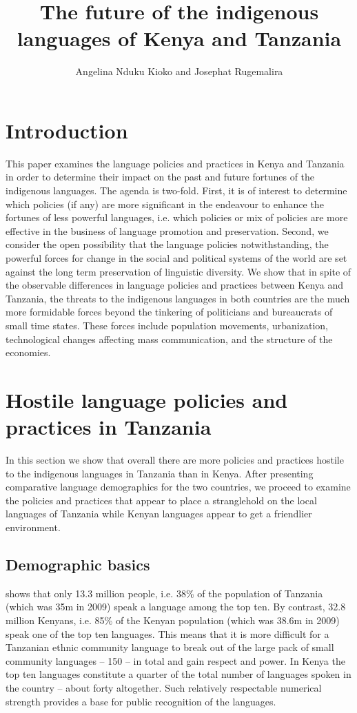 \documentclass[output=paper,colorlinks,citecolor=brown]{langscibook}
\author{Angelina Nduku Kioko\affiliation{US International University-Africa} and Josephat Rugemalira \affiliation{Tumaini University College Dar es Salaam}}
\title{The future of the indigenous languages of Kenya and Tanzania}
\begin{document}
\maketitle

\section{Introduction}\label{sec:kioko:1}

This paper examines the language policies and practices in Kenya and Tanzania in order to determine their impact on the past and future fortunes of the indigenous languages. The agenda is two-fold. First, it is of interest to determine which policies (if any) are more significant in the endeavour to enhance the fortunes of less powerful languages, i.e. which policies or mix of policies are more effective in the business of language promotion and preservation. Second, we consider the open possibility that the language policies notwithstanding, the powerful forces for change in the social and political systems of the world are set against the long term preservation of linguistic diversity. We show that in spite of the observable differences in language policies and practices between Kenya and Tanzania, the threats to the indigenous languages in both countries are the much more formidable forces beyond the tinkering of politicians and bureaucrats of small time states. These forces include population movements, urbanization, technological changes affecting mass communication, and the structure of the economies.

\section{Hostile language policies and practices in Tanzania}\label{sec:kioko:2}

In this section we show that overall there are more policies and practices hostile to the indigenous languages in Tanzania than in Kenya. After presenting comparative language demographics for the two countries, we proceed to examine the policies and practices that appear to place a stranglehold on the local languages of Tanzania while Kenyan languages appear to get a friendlier environment.

\subsection{Demographic basics}
 shows that only 13.3 million people, i.e. 38\% of the population of Tanzania (which was 35m in 2009) speak a language among the top ten. By contrast, 32.8 million Kenyans, i.e.  85\% of the Kenyan population (which was 38.6m in 2009) speak one of the top ten languages. This means that it is more difficult for a Tanzanian ethnic community language to break out of the large pack of small community languages -- 150 -- in total and gain respect and power. In Kenya the top ten languages constitute a quarter of the total number of languages spoken in the country – about forty altogether. Such relatively respectable numerical strength provides a base for public recognition of the languages.
\end{document}
